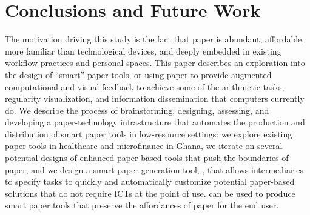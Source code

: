 \documentclass{sig-alternate}
\begin{document}






\section{Conclusions and Future Work}
\label{sec:future-work}

The motivation driving this study is the fact that paper is abundant, affordable, more familiar than technological devices, and deeply embedded in existing workflow practices and personal spaces. This paper describes an exploration into the design of ``smart'' paper tools, or using paper to provide augmented computational and visual feedback to achieve some of the arithmetic tasks, regularity visualization, and information dissemination that computers currently do. We describe the process of brainstorming, designing, assessing, and developing a paper-technology infrastructure that automates the production and distribution of smart paper tools in low-resource settings: we explore existing paper tools in healthcare and microfinance in Ghana, we iterate on several potential designs of enhanced paper-based tools that push the boundaries of paper, and we design a smart paper generation tool, \nifty, that allows intermediaries to specify tasks to quickly and automatically customize potential paper-based solutions that do not require ICTs at the point of use. \nifty can be used to produce smart paper tools that preserve the affordances of paper for the end user.
\end{document}
